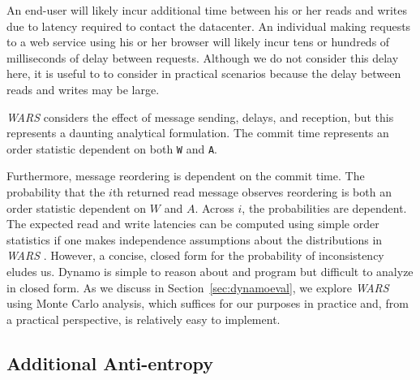 \documentclass{vldb}
\newcommand{\subsectionskip}{-0em}
\begin{document}
An end-user will likely incur additional time between his or her
reads and writes due to latency required to contact the datacenter.
An individual making requests to a web service using his or her
browser will likely incur tens or hundreds of milliseconds of delay
between requests.  Although we do not consider this delay here, it is
useful to to consider in practical scenarios because the delay between
reads and writes may be large.

\textit{WARS} considers the effect of message sending, delays, and
reception, but this represents a daunting analytical formulation.  The
commit time represents an order statistic dependent on both \texttt{W}
and \texttt{A}.  Furthermore, message reordering is
dependent on the commit time.  The probability that the $i$th returned
read message observes reordering is both an order statistic dependent
on $W$ and $A$.  Across $i$, the probabilities are dependent.  The
expected read and write latencies can be computed using simple order
statistics if one makes independence assumptions about the
distributions in \textit{WARS} .  However, a concise, closed form for
the probability of inconsistency eludes us.  Dynamo is simple to
reason about and program but difficult to analyze in closed form.  As
we discuss in Section~\ref{sec:dynamoeval}, we explore \textit{WARS}
using Monte Carlo analysis, which suffices for our purposes in
practice and, from a practical perspective, is relatively easy to
implement.

\vspace{\subsectionskip}\subsection{Additional Anti-entropy}
\end{document}
